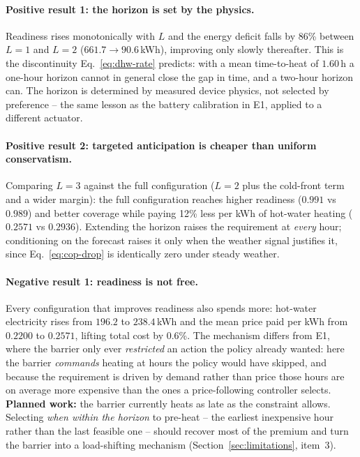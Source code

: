 \documentclass[11pt]{article}
\begin{document}
\paragraph{Positive result 1: the horizon is set by the physics.} Readiness rises
monotonically with $L$ and the energy deficit falls by 86\% between $L=1$ and
$L=2$ ($661.7 \to 90.6$\,kWh), improving only slowly thereafter. This is the
discontinuity Eq.~\ref{eq:dhw-rate} predicts: with a mean time-to-heat of
$1.60$\,h a one-hour horizon cannot in general close the gap in time, and a
two-hour horizon can. The horizon is determined by measured device physics, not
selected by preference -- the same lesson as the battery calibration in E1,
applied to a different actuator.

\paragraph{Positive result 2: targeted anticipation is cheaper than uniform
conservatism.} Comparing $L=3$ against the full configuration ($L=2$ plus the
cold-front term and a wider margin): the full configuration reaches higher
readiness ($0.991$ vs $0.989$) and better coverage while paying 12\% less per
kWh of hot-water heating ($0.2571$ vs $0.2936$). Extending the horizon raises the
requirement at \emph{every} hour; conditioning on the forecast raises it only
when the weather signal justifies it, since Eq.~\ref{eq:cop-drop} is identically
zero under steady weather.

\paragraph{Negative result 1: readiness is not free.} Every configuration that
improves readiness also spends more: hot-water electricity rises from $196.2$ to
$238.4$\,kWh and the mean price paid per kWh from $0.2200$ to $0.2571$, lifting
total cost by 0.6\%. The mechanism differs from E1, where the barrier only ever
\emph{restricted} an action the policy already wanted: here the barrier
\emph{commands} heating at hours the policy would have skipped, and because the
requirement is driven by demand rather than price those hours are on average
more expensive than the ones a price-following controller selects.
\textbf{Planned work:} the barrier currently heats as late as the constraint
allows. Selecting \emph{when within the horizon} to pre-heat -- the earliest
inexpensive hour rather than the last feasible one -- should recover most of the
premium and turn the barrier into a load-shifting mechanism
(Section~\ref{sec:limitations}, item~3).
\end{document}
